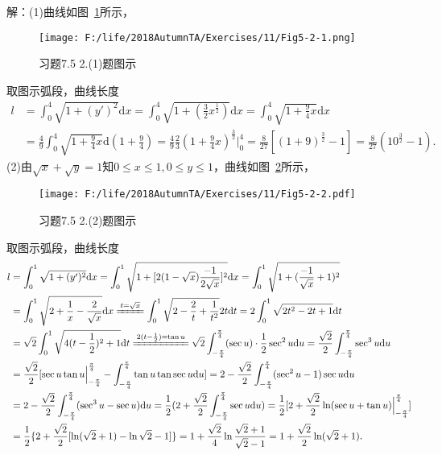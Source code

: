 \documentclass[12pt,UTF8]{ctexart}
\begin{document}
\begin{enumerate}
解：(1)曲线如图~\ref{5-2-1}所示，
\begin{figure}[H]
\begin{center}
\texttt{[image: F:/life/2018AutumnTA/Exercises/11/Fig5-2-1.png]}
\end{center}
\caption{习题7.5 2.(1)题图示}
\label{5-2-1}
\end{figure}
取图示弧段，曲线长度
\[\begin{split}
l&=\int_0^4\sqrt{1+(y')^2}\mathrm dx=\int_0^4\sqrt{1+(\frac32x^{\frac12})}\mathrm dx=\int_0^4\sqrt{1+\frac94x}\mathrm dx\\
&=\frac49\int_0^4\sqrt{1+\frac94x}\mathrm d(1+\frac94)=\frac49\frac23(1+\frac94x)^{\frac32}\Big|_0^4=\frac8{27}[(1+9)^\frac32-1]=\frac8{27}(10^{\frac32}-1).
\end{split}\]
(2)由$\sqrt x+\sqrt y=1$知$0\leq x\leq1,0\leq y\leq1$，曲线如图~\ref{5-2-2}所示，
\begin{figure}[H]
\begin{center}
\texttt{[image: F:/life/2018AutumnTA/Exercises/11/Fig5-2-2.pdf]}
\end{center}
\caption{习题7.5 2.(2)题图示}
\label{5-2-2}
\end{figure}
取图示弧段，曲线长度
\[\begin{split}
l&=\int_0^1\sqrt{1+(y')^2}\mathrm dx=\int_0^1\sqrt{1+[2(1-\sqrt x)\frac{-1}{2\sqrt x}]^2}\mathrm dx=\int_0^1\sqrt{1+(\frac{-1}{\sqrt x}+1)^2}\\
&=\int_0^1\sqrt{2+\frac1x-\frac2{\sqrt x}}\mathrm dx\xlongequal{t=\sqrt x}\int_0^1\sqrt{2-\frac2t+\frac1{t^2}}2t\mathrm dt=2\int_0^1\sqrt{2t^2-2t+1}\mathrm dt\\
&=\sqrt2\int_0^1\sqrt{4(t-\frac12)^2+1}\mathrm dt\xlongequal{2(t-\frac12)=\tan u}\sqrt2\int_{-\frac\pi4}^{\frac\pi4}(\sec u)\cdot\frac12\sec^2u\mathrm du=\frac{\sqrt2}2\int_{-\frac\pi4}^{\frac\pi4}\sec^3u\mathrm du\\
&=\frac{\sqrt2}2[\sec u\tan u\Big|_{-\frac\pi4}^{\frac\pi4}-\int_{-\frac\pi4}^{\frac\pi4}\tan u\tan \sec u\mathrm du]=2-\frac{\sqrt2}2\int_{-\frac\pi4}^{\frac\pi4}(\sec^2u-1)\sec u\mathrm du\\
&=2-\frac{\sqrt2}2\int_{-\frac\pi4}^{\frac\pi4}(\sec^3u-\sec u)\mathrm du=\frac12(2+\frac{\sqrt2}2\int_{-\frac\pi4}^{\frac\pi4}\sec u\mathrm du)=\frac12[2+\frac{\sqrt 2}2\ln(\sec u+\tan u)\Big|_{-\frac\pi4}^{\frac\pi4}]\\
&=\frac12\{2+\frac{\sqrt2}2[\ln(\sqrt 2+1)-\ln{\sqrt 2-1}]\}=1+\frac{\sqrt2}4\ln\frac{\sqrt2+1}{\sqrt2-1}=1+\frac{\sqrt2}2\ln(\sqrt2+1).

\end{split}\]
\end{enumerate}
\end{document}
